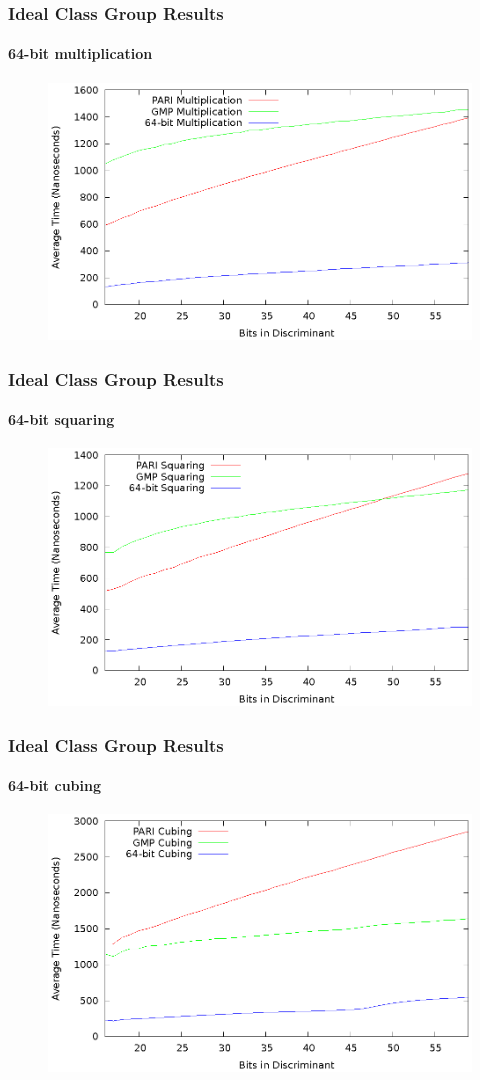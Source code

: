 \documentclass{beamer}
\begin{document}
\begin{frame}
\frametitle{Ideal Class Group Results}
\framesubtitle{64-bit multiplication}
\begin{figure}
\includegraphics[scale=0.86]{compose-64}
\end{figure}
\end{frame}
\begin{frame}
\frametitle{Ideal Class Group Results}
\framesubtitle{64-bit squaring}
\begin{figure}
\includegraphics[scale=0.86]{square-64}
\end{figure}
\end{frame}
\begin{frame}
\frametitle{Ideal Class Group Results}
\framesubtitle{64-bit cubing}
\begin{figure}
\includegraphics[scale=0.86]{cube-64}
\end{figure}
\end{frame}
\end{document}
